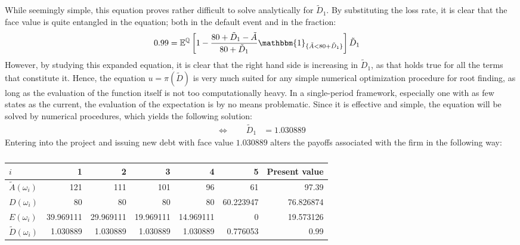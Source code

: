\documentclass[main.tex]{subfiles}
\begin{document}
        While seemingly simple, this equation proves rather difficult to solve analytically for $\tilde{D}_{1}$.
        By substituting the loss rate, it is clear that the face value is quite entangled in the equation;
        both in the default event and in the fraction:
            \begin{align*}
                \num{0.99}
                &= 
                \mathbb{E}^{\rnmeasure}\left[
                    1 
                    - 
                    \frac{
                        \num{80} + \tilde{D}_{1} - \tilde{A}
                    }{
                        \num{80} + \tilde{D}_{1}
                    }
                    \mathbbm{1}_{\{\tilde{A} < \num{80} + \tilde{D}_{1}\}} 
                \right] 
                \tilde{D}_{1} 
            \end{align*}
        However, by studying this expanded equation, it is clear that the right hand side 
        is increasing in $\tilde{D}_{1}$, as that holds true for all the terms that constitute it.
        Hence, the equation $u = \pi(\tilde{D})$ is very much suited for any simple numerical optimization procedure
        for root finding, as long as the evaluation of the function itself is not too computationally heavy.
        In a single-period framework, especially one with as few states as the current,
        the evaluation of the expectation is by no means problematic.
        Since it is effective and simple, the equation will be solved by numerical procedures, 
        which yields the following solution:
            \begin{align*}
                \Leftrightarrow  \qquad
                \tilde{D}_{1} &= \num{1.030889}
            \end{align*}
        Entering into the project and issuing new debt with face value $\num{1.030889}$ 
        alters the payoffs associated with the firm in the following way:
        \begin{table}[H]
            \centering
            \begin{tabular}{l|rrrrr||r}
                $i$ & 1 & 2 & 3 & 4 & 5 & Present value \\
                \hline
                $\tilde{A}(\omega_{i})$ 
                    & \num{121} & \num{111} & \num{101} & \num{96} & \num{61} & \num{97.39} \\
                $D(\omega_{i})$ 
                    & \num{80} & \num{80} & \num{80} & \num{80} & \num{60.223947} & \num{76.826874} \\
                $E(\omega_{i})$ 
                    & \num{39.969111} & \num{29.969111} & \num{19.969111} & \num{14.969111} & \num{0} & \num{19.573126} \\
                $\tilde{D}(\omega_{i})$ 
                    & \num{1.030889} & \num{1.030889} & \num{1.030889} & \num{1.030889} & \num{0.776053} & \num{0.99} \\
            \end{tabular}
            \caption{}
        \end{table}
\end{document}
